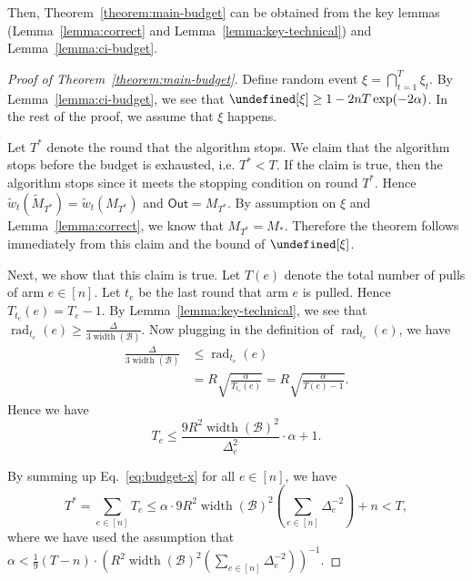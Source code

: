 \documentclass{article}
\newcommand{\B}{\mathcal B}
\DeclareMathOperator{\rank}{width}
\DeclareMathOperator{\rad}{rad}
\newcommand{\out}{\mathsf{Out}}
\let\Pr\undefined
\DeclareMathOperator{\Pr}{Pr}
\begin{document}
Then, Theorem~\ref{theorem:main-budget} can be obtained from the key lemmas (Lemma~\ref{lemma:correct} and Lemma~\ref{lemma:key-technical}) and Lemma~\ref{lemma:ci-budget}.
\begin{proof}[Proof of Theorem~\ref{theorem:main-budget}]
Define random event $\xi=\bigcap_{t=1}^T \xi_t$. 
By Lemma~\ref{lemma:ci-budget}, we see that $\Pr[\xi] \ge 1-2nT\exp(-2\alpha)$.
In the rest of the proof, we assume that $\xi$ happens.

Let $T^*$ denote the round that the algorithm stops.
We claim that the algorithm stops before the budget is exhausted, i.e. $T^* < T$.
If the claim is true, then the algorithm stops since it meets the stopping condition on round $T^*$.
Hence $\tilde w_t(\tilde M_{T^*}) = \tilde w_t(M_{T^*})$ and $\out = M_{T^*}$.
By assumption on $\xi$ and Lemma~\ref{lemma:correct}, we know that $M_{T^*} = M_*$.
Therefore the theorem follows immediately from this claim and the bound of $\Pr[\xi]$.

Next, we show that this claim is true.
Let $T(e)$ denote the total number of pulls of arm $e\in[n]$.
Let $t_e$ be the last round that arm $e$ is pulled.
Hence $T_{t_e}(e) = T_e-1$.
By Lemma~\ref{lemma:key-technical}, we see that $\rad_{t_e}(e) \ge \frac{\Delta}{3\rank(\B)}$.
Now plugging in the definition of $\rad_{t_e}(e)$, we have
\begin{align*}
	\frac{\Delta}{3\rank(\B)} &\le \rad_{t_e}(e) \\
										        &= R\sqrt{\frac{\alpha}{T_{t_e}(e)}} = R\sqrt{\frac{\alpha}{T(e) -1}}.
\end{align*}
Hence we have
\begin{equation}
\label{eq:budget-x}
T_e \le \frac{9R^2\rank(\B)^2}{\Delta_e^2}\cdot\alpha+1.
\end{equation}

By summing up Eq.~\eqref{eq:budget-x} for all $e\in [n]$, we have
$$
T^* = \sum_{e\in [n]} T_e \le \alpha \cdot 9R^2\rank(\B)^2 \left(\sum_{e\in[n]}\Delta_e^{-2}\right)+n < T,
$$
where we have used the assumption that $\alpha < \frac{1}9 (T-n) \cdot \left(R^2\rank(\B)^2 \left(\sum_{e\in[n]}\Delta_e^{-2}\right)\right)^{-1}.$

\end{proof}
\end{document}
